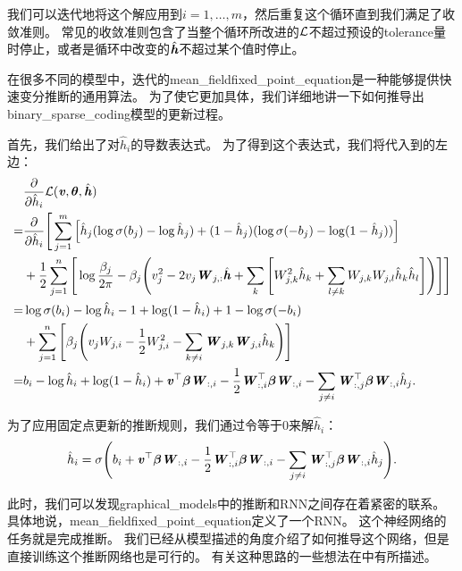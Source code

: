 我们可以迭代地将这个解应用到$i = 1,\ldots,m$，然后重复这个循环直到我们满足了收敛准则。
常见的收敛准则包含了当整个循环所改进的$\mathcal{L}$不超过预设的\gls{tolerance}量时停止，或者是循环中改变的$\hat{\boldsymbol{\mathit{h}}}$不超过某个值时停止。

在很多不同的模型中，迭代的\gls{mean_field}\gls{fixed_point_equation}是一种能够提供快速变分推断的通用算法。
为了使它更加具体，我们详细地讲一下如何推导出\gls{binary_sparse_coding}模型的更新过程。


首先，我们给出了对$\hat{h}_i$的导数表达式。
为了得到这个表达式，我们将代入到的左边：
\begin{align}
& \frac{\partial}{\partial \hat{h}_i} \mathcal{L} (\boldsymbol{\mathit{v}},\boldsymbol{\theta},\hat{\boldsymbol{\mathit{h}}})    \\
= & \frac{\partial}{\partial \hat{h}_i} \Bigg[\sum_{j=1}^{m}\Big[\hat{h}_j (\log \sigma(b_j) - \log \hat{h}_j) + (1 - \hat{h}_j)(\log \sigma(-b_j) - \log (1-\hat{h}_j))\Big] \\
& + \frac{1}{2} \sum_{j=1}^{n} \Bigg[ \log {\frac{\beta_j}{2\pi}} - \beta_j \Bigg(v_j^2 - 2 v_j \boldsymbol{\mathit{W}}_{j,:}\hat{\boldsymbol{\mathit{h}}} + \sum_{k}\Bigg[W^2_{j,k}\hat{h}_k + \sum_{l \neq k}W_{j,k}W_{j,l}\hat{h}_k\hat{h}_l \Bigg] \Bigg) \Bigg]\Bigg] \\
= & \log \sigma(b_i) - \log \hat{h}_i - 1 + \log (1 - \hat{h}_i ) + 1 - \log \sigma (- b_i ) \\
 & + \sum_{j=1}^{n} \Bigg[\beta_j \Bigg(v_j W_{j,i} - \frac{1}{2} W_{j,i}^2 - \sum_{k \neq i} \boldsymbol{\mathit{W}}_{j,k}\boldsymbol{\mathit{W}}_{j,i} \hat{h}_k\Bigg) \Bigg]\\
 = & b_i - \log \hat{h}_i + \log (1 - \hat{h}_i ) + \boldsymbol{\mathit{v}}^{\top} {\boldsymbol{\beta}} \boldsymbol{\mathit{W}}_{:,i} - \frac{1}{2} \boldsymbol{\mathit{W}}_{:,i}^{\top} {\boldsymbol{\beta}}\boldsymbol{\mathit{W}}_{:,i} -\sum_{j\neq i}\boldsymbol{\mathit{W}}^{\top}_{:,j}{\boldsymbol{\beta}}\boldsymbol{\mathit{W}}_{:,i}\hat{h}_j.
 \label{eqn:1943}
\end{align}

为了应用固定点更新的推断规则，我们通过令等于$0$来解$\hat{h}_i$：
\begin{align}
\label{eqn:1944}
\hat{h}_i = \sigma\Bigg(b_i + \boldsymbol{\mathit{v}}^{\top} {\boldsymbol{\beta}} \boldsymbol{\mathit{W}}_{:,i} - \frac{1}{2} \boldsymbol{\mathit{W}}_{:,i}^{\top} {\boldsymbol{\beta}} \boldsymbol{\mathit{W}}_{:,i} - \sum_{j \neq i }  \boldsymbol{\mathit{W}}_{:,j}^{\top} {\boldsymbol{\beta}}  \boldsymbol{\mathit{W}}_{:,i} \hat{h}_j \Bigg).
\end{align}

此时，我们可以发现\gls{graphical_models}中的推断和\gls{RNN}之间存在着紧密的联系。
具体地说，\gls{mean_field}\gls{fixed_point_equation}定义了一个\gls{RNN}。
这个神经网络的任务就是完成推断。
我们已经从模型描述的角度介绍了如何推导这个网络，但是直接训练这个推断网络也是可行的。
有关这种思路的一些想法在中有所描述。


